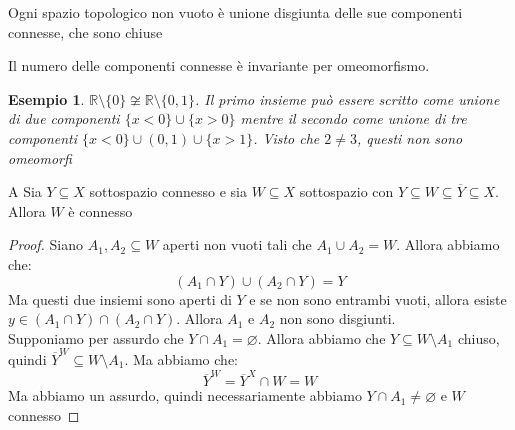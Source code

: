 \documentclass[11pt,a4paper,twoside]{article}
\newtheorem{es}{Esempio}
\theoremstyle{definition}
\begin{document}
\begin{thm}{}{}\label{ABC}
	Ogni spazio topologico non vuoto è unione disgiunta delle sue componenti connesse, che sono chiuse
\end{thm}

\begin{cor}{}{}
	Il numero delle componenti connesse è invariante per omeomorfismo.
\end{cor}

\begin{es}
	$\mathbb R\setminus \{0\}\not \cong \mathbb R \setminus \{0,1\}$. Il primo insieme può essere scritto come unione di due componenti $\{x<0\} \cup \{x>0\}$ mentre il secondo come unione di tre componenti $\{x<0\}\cup (0,1) \cup \{x>1\}$. Visto che $2 \neq 3$, questi non sono omeomorfi
\end{es}

\begin{lemma}{A}{}
	Sia $Y \subseteq X$ sottospazio connesso e sia $W\subseteq X$ sottospazio con $Y \subseteq W \subseteq \overline Y \subseteq X $. Allora $W$ è connesso
\end{lemma}
\begin{proof}
	Siano $A_1, A_2 \subseteq W$ aperti non vuoti tali che $A_1 \cup A_2 = W$. Allora abbiamo che:
	\[ (A_1 \cap Y)\cup (A_2 \cap Y) =Y \]
	Ma questi due insiemi sono aperti di $Y$ e se non sono entrambi vuoti, allora esiste $y \in (A_1\cap Y)\cap (A_2\cap Y)$. Allora $A_1$ e $A_2$ non sono disgiunti.\\
	Supponiamo per assurdo che $Y \cap A_1 = \varnothing$. Allora abbiamo che $Y \subseteq W\setminus A_1$ chiuso, quindi $\overline Y^W \subseteq W \setminus A_1$. Ma abbiamo che:
	\[ \overline Y^W = \overline Y^X \cap W = W \]
	Ma abbiamo un assurdo, quindi necessariamente abbiamo $Y \cap A_1 \neq \varnothing$ e $W$ connesso
\end{proof}
\end{document}
